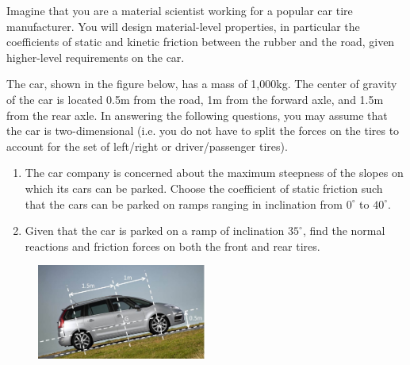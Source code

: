 
\noindent Imagine that you are a material scientist working for a popular car tire manufacturer. You will design material-level properties, in particular the coefficients of static and kinetic friction between the rubber and the road, given higher-level requirements on the car. 

\noindent The car, shown in the figure below, has a mass of 1,000kg. The center of gravity of the car is located 0.5m from the road, 1m from the forward axle, and 1.5m from the rear axle. In answering the following questions, you may assume that the car is two-dimensional (i.e. you do not have to split the forces on the tires to account for the set of left/right or driver/passenger tires).

\begin{enumerate}
  \item The car company is concerned about the maximum steepness of the slopes on which its cars can be parked. Choose the coefficient of static friction such that the cars can be parked on ramps ranging in inclination from $0^\circ$ to $40^\circ$.  
  \item Given that the car is parked on a ramp of inclination $35^\circ$, find the normal reactions and friction forces on both the front and rear tires.
\end{enumerate}

\begin{figure}[ht!]
  \centering
  \includegraphics[width=0.5\textwidth,
	           height=0.2\textheight,
		   keepaspectratio]{fig.png}
\end{figure}


